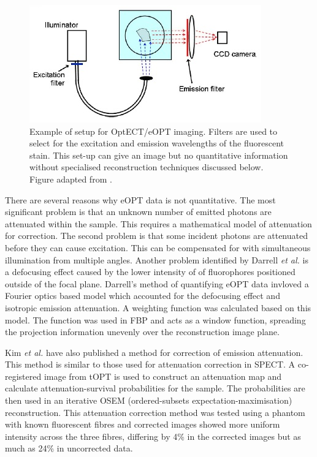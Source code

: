 \documentclass[12pt]{article}
\begin{document}
\begin{figure}[H]
\centering
\includegraphics[scale=1]{Oldham_2007ku_eCTsetup.jpg}
\caption{Example of setup for OptECT/eOPT imaging. Filters are used to select for the excitation and emission wavelengths of the fluorescent stain. This set-up can give an image but no quantitative information without specialised reconstruction techniques discussed below. Figure adapted from \cite{Oldham:2007ku}.}
\label{fig:eOPTsetup}
\end{figure}







There are several reasons why eOPT data is not quantitative. The most significant problem is that an unknown number of emitted photons are attenuated within the sample. This requires a mathematical model of attenuation for correction. The second problem is that some incident photons are attenuated before they can cause excitation.  This can be compensated for with simultaneous illumination from multiple angles.\cite{Kim:2008eua}  Another problem identified by Darrell \textit{et al.} is a defocusing effect caused by the lower intensity of of fluorophores positioned outside of the focal plane. Darrell's method of quantifying eOPT data invloved a Fourier optics based model which accounted for the defocusing effect and isotropic emission attenuation. \cite{Darrell:2008gd} A weighting function was calculated based on this model. The function was used in FBP and acts as a window function, spreading the projection information unevenly over the reconstruction image plane.

Kim \textit{et al.} have also published a method for correction of emission attenuation. \cite{Kim:2008eua} This method is similar to those used for attenuation correction in SPECT. A co-registered image from tOPT is used to construct an attenuation map and calculate attenuation-survival probabilities for the sample. The probabilities are then used in an iterative OSEM (ordered-subsets expectation-maximisation) reconstruction. \cite{Kim:2008eua, hudson1994accelerated} This attenuation correction method was tested using a  phantom with known fluorescent fibres and corrected images showed more uniform intensity across the three fibres, differing by 4\% in the corrected images but as much as 24\% in uncorrected data. \cite{Kim:2008eua}
\end{document}
